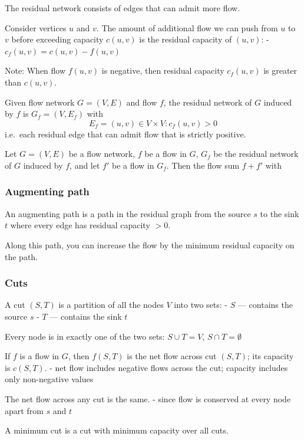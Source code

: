 \documentclass[11pt]{article}
\begin{document}
The residual network consists of edges that can admit more flow.

Consider vertices \(u\) and \(v\). The amount of additional flow we can
push from \(u\) to \(v\) before exceeding capacity \(c(u, v)\) is the
residual capacity of \((u, v)\): - \(c_f(u, v) = c(u, v) - f(u, v)\)

Note: When flow \(f(u, v)\) is negative, then residual capacity
\(c_f(u, v)\) is greater than \(c(u, v)\).

Given flow network \(G = (V, E)\) and flow \(f\), the residual network
of \(G\) induced by \(f\) is \(G_f = (V, E_f)\) with
\[E_f = {(u, v) \in V \times V : c_f (u, v) > 0}\] i.e.~each residual
edge that can admit flow that is strictly positive.

Let \(G = (V, E)\) be a flow network, \(f\) be a flow in \(G\), \(G_f\)
be the residual network of \(G\) induced by \(f\), and let \(f'\) be a
flow in \(G_f\). Then the flow sum \(f + f'\) with

    \subsubsection{Augmenting path}\label{augmenting-path}

An augmenting path is a path in the residual graph from the source \(s\)
to the sink \(t\) where every edge has residual capacity \(> 0\).

Along this path, you can increase the flow by the minimum residual
capacity on the path.

    \subsubsection{Cuts}\label{cuts}

A cut \((S,T)\) is a partition of all the nodes \(V\) into two sets: -
\(S\) --- contains the source \(s\) - \(T\) --- contains the sink \(t\)

Every node is in exactly one of the two sets: \(S \cup T = V\),
\(S \cap T = \emptyset\)

If \(f\) is a flow in \(G\), then \(f(S,T)\) is the net flow across cut
\((S,T)\); its capacity is \(c(S,T)\). - net flow includes negative
flows across the cut; capacity includes only non-negative values

The net flow across any cut is the same. - since flow is conserved at
every node apart from \(s\) and \(t\)

A minimum cut is a cut with minimum capacity over all cuts.
\end{document}
